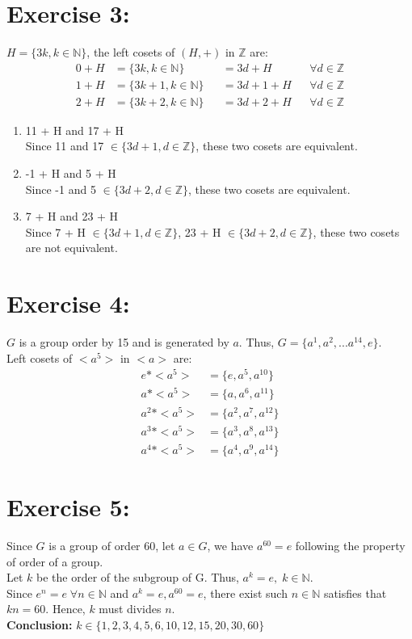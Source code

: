 \documentclass{article}
\newcommand{\Z}{\mathbb{Z}}
\newcommand{\N}{\mathbb{N}}
\begin{document}
	\section{Exercise 3:}
		$H = \{3k, k \in \N \}$, the left cosets of $(H, +)$ in $\Z$ are:
		\begin{align*}
			0 + H &= \{3k, k \in \N \} &&= 3d + H && \forall d \in \Z\\
			1 + H &= \{3k+1, k \in \N \} &&= 3d+1 + H && \forall d \in \Z\\
			2 + H &= \{3k+2, k \in \N \} &&=  3d+2 + H && \forall d \in \Z
		\end{align*}
		\begin{enumerate}
			\item 11 + H and 17 + H\\
			Since 11 and 17 $\in \{3d+1, d \in \Z \}$, these two cosets are equivalent.
			\item -1 + H and 5 + H\\
			Since -1 and 5 $\in \{3d+2, d \in \Z \}$, these two cosets are equivalent.
			\item 7 + H and 23 + H\\
			Since 7 + H $\in \{3d+1, d \in \Z \}$, 23 + H $\in \{3d+2, d \in \Z \}$, these two cosets are not equivalent.
		\end{enumerate}
	
	\section{Exercise 4:}
		$G$ is a group order by 15 and is generated by $a$. Thus, $ G = \{a^1, a^2,...a^{14}, e\}$.\\
		Left cosets of $<a^5>$ in $<a>$ are:
		\begin{align*}
			e * <a^5> &= \{e, a^5, a^{10}\}\\
			a * <a^5> &= \{a, a^6, a^{11}\}\\
			a^2 * <a^5> &= \{a^2, a^7, a^{12}\}\\
			a^3 * <a^5> &= \{a^3, a^8, a^{13}\}\\
			a^4 * <a^5> &= \{a^4, a^9, a^{14}\}
		\end{align*}
	
	\section{Exercise 5:}
		Since $G$ is a group of order 60, let $a \in G$, we have $a^{60} = e$ following the property of order of a group.\\
		Let $k$ be the order of the subgroup of G. Thus, $a^k = e, \; k \in \N$.\\
		Since $e^n = e \; \forall n \in \N$ and $a^k = e, a^{60} = e$, there exist such $n \in \N$ satisfies that $kn = 60$. Hence, $k$ must divides $n$.\\
		\textbf{Conclusion: } $k \in \{1,2,3,4,5,6,10,12,15,20,30,60\}$
\end{document}
